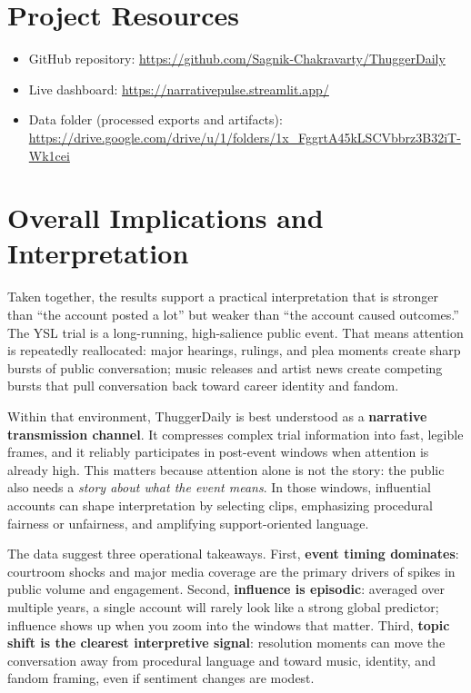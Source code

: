 \documentclass[12pt]{article}
\begin{document}
\newpage
\section{Project Resources}
\begin{itemize}[leftmargin=*]
\item GitHub repository: \url{https://github.com/Sagnik-Chakravarty/ThuggerDaily}
\item Live dashboard: \url{https://narrativepulse.streamlit.app/}
\item Data folder (processed exports and artifacts): \url{https://drive.google.com/drive/u/1/folders/1x_FggrtA45kLSCVbbrz3B32iT-Wk1cei}
\end{itemize}

\newpage
\section{Overall Implications and Interpretation}
Taken together, the results support a practical interpretation that is stronger than ``the account posted a lot'' but weaker than ``the account caused outcomes.'' The YSL trial is a long-running, high-salience public event. That means attention is repeatedly reallocated: major hearings, rulings, and plea moments create sharp bursts of public conversation; music releases and artist news create competing bursts that pull conversation back toward career identity and fandom.

Within that environment, ThuggerDaily is best understood as a \textbf{narrative transmission channel}. It compresses complex trial information into fast, legible frames, and it reliably participates in post-event windows when attention is already high. This matters because attention alone is not the story: the public also needs a \emph{story about what the event means}. In those windows, influential accounts can shape interpretation by selecting clips, emphasizing procedural fairness or unfairness, and amplifying support-oriented language.

The data suggest three operational takeaways. First, \textbf{event timing dominates}: courtroom shocks and major media coverage are the primary drivers of spikes in public volume and engagement. Second, \textbf{influence is episodic}: averaged over multiple years, a single account will rarely look like a strong global predictor; influence shows up when you zoom into the windows that matter. Third, \textbf{topic shift is the clearest interpretive signal}: resolution moments can move the conversation away from procedural language and toward music, identity, and fandom framing, even if sentiment changes are modest.
\end{document}
